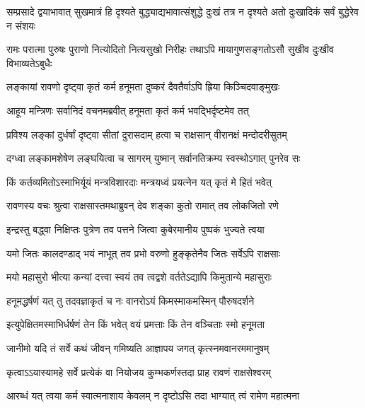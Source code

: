 \threelineshloka
{सम्प्रसादे द्वयाभावात् सुखमात्रं हि दृश्यते}
{बुद्ध्याद्यभावात्संशुद्धे दुःखं तत्र न दृश्यते}
{अतो दुःखादिकं सर्वं बुद्धेरेव न संशयः} %

\fourlineindentedshloka
{रामः परात्मा पुरुषः पुराणो}
{नित्योदितो नित्यसुखो निरीहः}
{तथाऽपि मायागुणसङ्गतोऽसौ}
{सुखीव दुःखीव विभाव्यतेऽबुधैः} %






\twolineshloka
{लङ्कायां रावणो दृष्ट्वा कृतं कर्म हनूमता}
{दुष्करं दैवतैर्वाऽपि ह्रिया किञ्चिदवाङ्मुखः} %

\twolineshloka
{आहूय मन्त्रिणः सर्वानिदं वचनमब्रवीत्}
{हनूमता कृतं कर्म भवद्भिर्दृष्टमेव तत्} %

\twolineshloka
{प्रविश्य लङ्कां दुर्धर्षां दृष्ट्वा सीतां दुरासदाम्}
{हत्वा च राक्षसान् वीरानक्षं मन्दोदरीसुतम्} %

\twolineshloka
{दग्ध्वा लङ्कामशेषेण लङ्घयित्वा च सागरम्}
{युष्मान् सर्वानतिक्रम्य स्वस्थोऽगात् पुनरेव सः} %

\twolineshloka
{किं कर्तव्यमितोऽस्माभिर्यूयं मन्त्रविशारदाः}
{मन्त्रयध्वं प्रयत्नेन यत् कृतं मे हितं भवेत्} %

\twolineshloka
{रावणस्य वचः श्रुत्वा राक्षसास्तमथाब्रुवन्}
{देव शङ्का कुतो रामात् तव लोकजितो रणे} %

\twolineshloka
{इन्द्रस्तु बद्\mbox{}ध्वा निक्षिप्तः पुत्रेण तव पत्तने}
{जित्वा कुबेरमानीय पुष्पकं भुज्यते त्वया} %

\twolineshloka
{यमो जितः कालदण्डाद् भयं नाभूत् तव प्रभो}
{वरुणो हुङ्कृतेनैव जितः सर्वेऽपि राक्षसाः} %

\twolineshloka
{मयो महासुरो भीत्या कन्यां दत्त्वा स्वयं तव}
{त्वद्वशे वर्ततेऽद्यापि किमुतान्ये महासुराः} %

\twolineshloka
{हनूमद्धर्षणं यत् तु तदवज्ञाकृतं च नः}
{वानरोऽयं किमस्माकमस्मिन् पौरुषदर्शने} %

\twolineshloka
{इत्युपेक्षितमस्माभिर्धर्षणं तेन किं भवेत्}
{वयं प्रमत्ताः किं तेन वञ्चिताः स्मो हनूमता} %

\twolineshloka
{जानीमो यदि तं सर्वे कथं जीवन् गमिष्यति}
{आज्ञापय जगत् कृत्स्नमवानरममानुषम्} %

\twolineshloka
{कृत्वाऽऽयास्यामहे सर्वे प्रत्येकं वा नियोजय}
{कुम्भकर्णस्तदा प्राह रावणं राक्षसेश्वरम्} %

\twolineshloka
{आरब्धं यत् त्वया कर्म स्वात्मनाशाय केवलम्}
{न दृष्टोऽसि तदा भाग्यात् त्वं रामेण महात्मना} %


